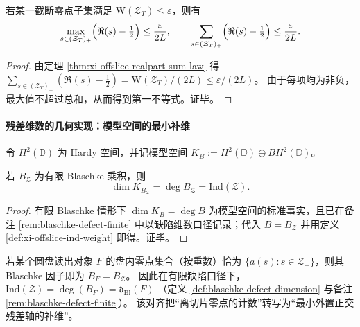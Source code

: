 \begin{corollary}[近临界线稳定性]\label{cor:xi-offslice-near-critical-stability}
若某一截断零点子集满足 \(\mathrm{W}(\mathcal Z_T)\le \varepsilon\)，则有
\[
\max_{s\in(\mathcal Z_T)_{+}}\Bigl(\Re(s)-\tfrac12\Bigr)\le \frac{\varepsilon}{2L},
\qquad
\sum_{s\in(\mathcal Z_T)_{+}}\Bigl(\Re(s)-\tfrac12\Bigr)\le \frac{\varepsilon}{2L}.
\]
\end{corollary}

\begin{proof}
由定理 \ref{thm:xi-offslice-realpart-sum-law} 得
\(
\sum_{s\in(\mathcal Z_T)_{+}}(\Re(s)-\tfrac12)=\mathrm{W}(\mathcal Z_T)/(2L)\le \varepsilon/(2L)
\)。
由于每项均为非负，最大值不超过总和，从而得到第一不等式。证毕。
\end{proof}

\paragraph{残差维数的几何实现：模型空间的最小补维}
令 \(H^2(\mathbb{D})\) 为 Hardy 空间，并记模型空间 \(K_B:=H^2(\mathbb{D})\ominus BH^2(\mathbb{D})\)。

\begin{proposition}[残差维数的几何实现]\label{prop:xi-offslice-model-space-dimension}
若 \(B_{\mathcal Z}\) 为有限 Blaschke 乘积，则
\[
\dim K_{B_{\mathcal Z}}=\deg B_{\mathcal Z}=\mathrm{Ind}(\mathcal Z).
\]
\end{proposition}

\begin{proof}
有限 Blaschke 情形下 \(\dim K_B=\deg B\) 为模型空间的标准事实，且已在备注 \ref{rem:blaschke-defect-finite} 中以缺陷维数口径记录；代入 \(B=B_{\mathcal Z}\) 并用定义 \ref{def:xi-offslice-ind-weight} 即得。证毕。
\end{proof}

\begin{remark}\label{rem:xi-offslice-ind-equals-dbl}
若某个圆盘读出对象 \(F\) 的盘内零点集合（按重数）恰为 \(\{a(s):s\in\mathcal Z_{+}\}\)，则其 Blaschke 因子即为 \(B_F=B_{\mathcal Z}\)。
因此在有限缺陷口径下，
\(
\mathrm{Ind}(\mathcal Z)=\deg(B_F)=\mathfrak d_{\mathrm{Bl}}(F)
\)
（定义 \ref{def:blaschke-defect-dimension} 与备注 \ref{rem:blaschke-defect-finite}）。
该对齐把“离切片零点的计数”转写为“最小外置正交残差轴的补维”。
\end{remark}

